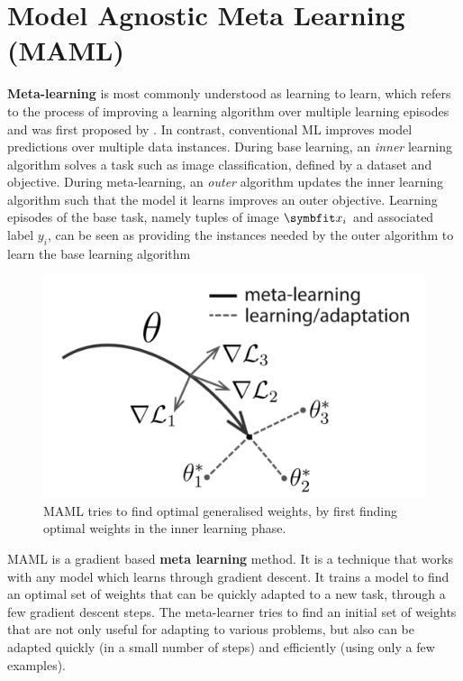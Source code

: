 \section{Model Agnostic Meta Learning (MAML)}\label{sec:maml}
\textbf{Meta-learning} is most commonly understood as learning to learn, which refers to the process of improving a learning algorithm over multiple learning episodes and was first proposed by \textcite{schmidhuber:1987:srl}. In contrast, conventional ML improves model predictions over multiple data instances. 
During base learning, an \emph{inner} learning algorithm solves a task such as image classification, defined by a dataset and objective. During meta-learning, an \emph{outer} algorithm updates the inner learning algorithm such that the model it learns improves an outer objective.
Learning episodes of the base task, namely tuples of image $\bfitx_i$ and associated label $y_i$, can be seen as providing the instances needed by the outer algorithm to learn the base learning algorithm

\begin{figure}
    \centering
    \includegraphics[scale=0.23]{chapters/assets/fsl/maml.png}
    \caption{MAML tries to find optimal generalised weights, by first finding optimal weights in the inner learning phase.}
    \label{fig:maml}
\end{figure}
MAML is a gradient based \textbf{meta learning} method. It is a technique that works with any model which learns through gradient descent. It trains a model to find an optimal set of weights that can be quickly adapted to a new task, through a few gradient descent steps. The meta-learner tries to find an initial set of weights that are not only useful for adapting to various problems, but also can be adapted quickly (in a small number of steps) and efficiently (using only a few examples).

